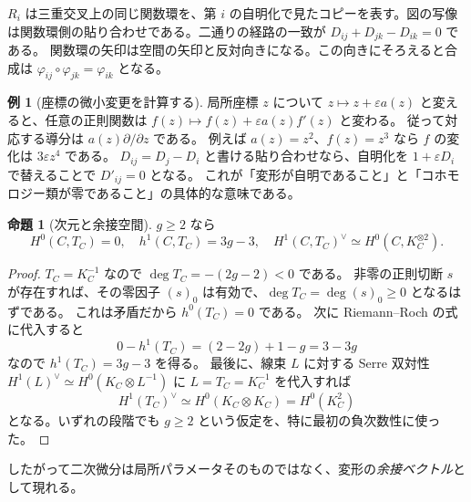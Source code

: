 \documentclass[dvipdfmx,a4paper,11pt]{article}
\theoremstyle{definition}
\newtheorem{prop}[thm]{命題}
\newtheorem{exa}[thm]{例}
\newcommand{\eps}{\varepsilon}
\begin{document}
\par\medskip
\noindent\begin{minipage}{\linewidth}
\begin{center}
\end{center}
$R_i$ は三重交叉上の同じ関数環を、第 $i$ の自明化で見たコピーを表す。図の写像は関数環側の貼り合わせである。二通りの経路の一致が $D_{ij}+D_{jk}-D_{ik}=0$ である。
関数環の矢印は空間の矢印と反対向きになる。この向きにそろえると合成は $\varphi_{ij}\circ\varphi_{jk}=\varphi_{ik}$ となる。
\end{minipage}\par\medskip

\begin{exa}[座標の微小変更を計算する]
局所座標 $z$ について $z\mapsto z+\eps a(z)$ と変えると、任意の正則関数は
$f(z)\mapsto f(z)+\eps a(z)f'(z)$ と変わる。
従って対応する導分は $a(z)\partial/\partial z$ である。
例えば $a(z)=z^2$、$f(z)=z^3$ なら $f$ の変化は $3\eps z^4$ である。
$D_{ij}=D_j-D_i$ と書ける貼り合わせなら、自明化を $1+\eps D_i$ で替えることで $D'_{ij}=0$ となる。
これが「変形が自明であること」と「コホモロジー類が零であること」の具体的な意味である。
\end{exa}


\begin{prop}[次元と余接空間]\label{prop:dimension}
$g\ge2$ なら
\[
H^0(C,T_C)=0,\quad h^1(C,T_C)=3g-3,\quad
H^1(C,T_C)^\vee\simeq H^0(C,K_C^{\otimes2}).
\]
\end{prop}
\begin{proof}
$T_C=K_C^{-1}$ なので $\deg T_C=-(2g-2)<0$ である。
非零の正則切断 $s$ が存在すれば、その零因子 $(s)_0$ は有効で、$\deg T_C=\deg(s)_0\ge0$ となるはずである。
これは矛盾だから $h^0(T_C)=0$ である。
次に Riemann--Roch の式に代入すると
\[
0-h^1(T_C)=(2-2g)+1-g=3-3g
\]
なので $h^1(T_C)=3g-3$ を得る。
最後に、線束 $L$ に対する Serre 双対性
$H^1(L)^\vee\simeq H^0(K_C\otimes L^{-1})$ に $L=T_C=K_C^{-1}$ を代入すれば
\[
H^1(T_C)^\vee\simeq H^0(K_C\otimes K_C)=H^0(K_C^2)
\]
となる。いずれの段階でも $g\ge2$ という仮定を、特に最初の負次数性に使った。
\end{proof}
したがって二次微分は局所パラメータそのものではなく、変形の\emph{余接ベクトル}として現れる。
\end{document}
